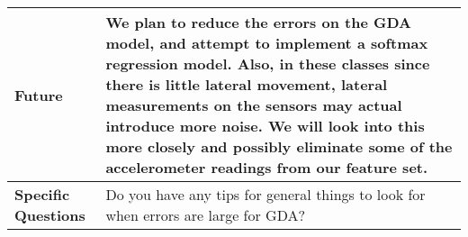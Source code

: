 \documentclass{cs229report}
\begin{document}
\begin{tabular}[]{|l|p{5in}|}
  \\ \hline
  \textbf{Future} & We plan to reduce the errors on the GDA model, 
  and attempt to implement a softmax regression model.
  Also, in these classes since there is little lateral movement,
  lateral measurements on the sensors may actual introduce more noise.
  We will look into this more closely and possibly eliminate some of the
  accelerometer readings from our feature set.
  \\ \hline
  \textbf{Specific Questions} & Do you have any tips for general things to look for when
  errors are large for GDA?\\ \hline
\end{tabular}
\end{document}
